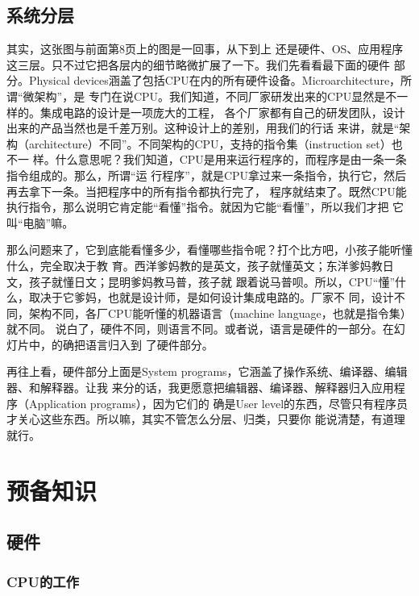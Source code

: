 \documentclass{wx672ctexart}
\newcommand\mpic[1]{%
  \marginpar{\texttt{[image: thumbnails/\#1]}}}
\begin{document}
\subsection{系统分层}
\label{sec:org73e4df6}\mpic{pg_0018}

其实，这张图与前面第8页上的图是一回事，从下到上
还是硬件、OS、应用程序这三层。只不过它把各层内的细节略微扩展了一下。我们先看看最下面的硬件
部分。Physical devices涵盖了包括CPU在内的所有硬件设备。Microarchitecture，所谓“微架构”，是
专门在说CPU。我们知道，不同厂家研发出来的CPU显然是不一样的。集成电路的设计是一项庞大的工程，
各个厂家都有自己的研发团队，设计出来的产品当然也是千差万别。这种设计上的差别，用我们的行话
来讲，就是“架构（architecture）不同”。不同架构的CPU，支持的指令集（instruction set）也不一
样。什么意思呢？我们知道，CPU是用来运行程序的，而程序是由一条一条指令组成的。那么，所谓“运
行程序”，就是CPU拿过来一条指令，执行它，然后再去拿下一条。当把程序中的所有指令都执行完了，
程序就结束了。既然CPU能执行指令，那么说明它肯定能“看懂”指令。就因为它能“看懂”，所以我们才把
它叫“电脑”嘛。

那么问题来了，它到底能看懂多少，看懂哪些指令呢？打个比方吧，小孩子能听懂什么，完全取决于教
育。西洋爹妈教的是英文，孩子就懂英文；东洋爹妈教日文，孩子就懂日文；昆明爹妈教马普，孩子就
跟着说马普呗。所以，CPU“懂”什么，取决于它爹妈，也就是设计师，是如何设计集成电路的。厂家不
同，设计不同，架构不同，各厂CPU能听懂的机器语言（machine language，也就是指令集）就不同。
说白了，硬件不同，则语言不同。或者说，语言是硬件的一部分。在幻灯片中，的确把语言归入到
了硬件部分。

再往上看，硬件部分上面是System programs，它涵盖了操作系统、编译器、编辑器、和解释器。让我
来分的话，我更愿意把编辑器、编译器、解释器归入应用程序（Application programs），因为它们的
确是User level的东西，尽管只有程序员才关心这些东西。所以嘛，其实不管怎么分层、归类，只要你
能说清楚，有道理就行。

\section{预备知识}
\subsection{硬件}

\subsubsection{CPU的工作}
\label{sec:orgf4b63a4}
\end{document}
